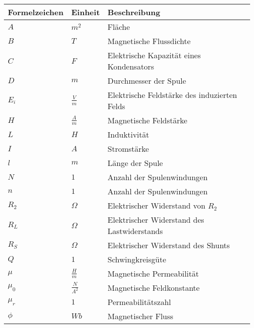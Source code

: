 \documentclass[12pt]{article}
\begin{document}

\begin{longtable}{p{}p{}p{}}
	\textbf{Formelzeichen}&\textbf{Einheit}&\textbf{Beschreibung}\\ \endhead
	\(A\) & \(m^2\) & Fläche \\
	\(B\) & \(T\) & Magnetische Flussdichte \\
	\(C\) & \(F\) & Elektrische Kapazität eines Kondensators \\
	\(D\) & \(m\) & Durchmesser der Spule \\
	\(E_i\) & \(\frac{V}{m}\) & Elektrische Feldstärke des induzierten Felds \\
	\(H\) & \(\frac{A}{m}\) & Magnetische Feldstärke \\
	\(L\) & \(H\) & Induktivität \\
	\(I\) & \(A\) & Stromstärke \\
	\(l\)& \(m\) & Länge der Spule \\
	\(N\) & \(1\) & Anzahl der Spulenwindungen \\
	\(n\) & \(1\) & Anzahl der Spulenwindungen \\
	\(R_{2}\)& \(\Omega\) & Elektrischer Widerstand von \(R_{2}\) \\
	\(R_{L}\) & \(\Omega\) & Elektrischer Widerstand des Lastwiderstands \\
	\(R_{S}\) & \(\Omega\) & Elektrischer Widerstand des Shunts \\
	\(Q\) &  \(1\) &  Schwingkreisgüte \\
	\(\mu\) &  \(\frac{H}{m}\) &  Magnetische Permeabilität \\
	\(\mu_{0}\) &  \(\frac{N}{A^2}\) &  Magnetische Feldkonstante \\
	\(\mu_{r}\) &  \(1\) &  Permeabilitätszahl \\
	\(\phi\) &  \(Wb\) &  Magnetischer Fluss \\
\end{longtable}
\end{document}
